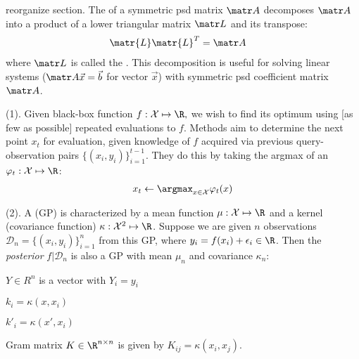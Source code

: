 \documentclass[11pt]{article}
\begin{document}
  reorganize section. The  of a symmetric psd matrix $\matr A$ decomposes $\matr A$ into a product of a lower triangular matrix $\matr L$ and its transpose:
\begin{align}
	\matr{L} \matr{L}^T &= \matr A
\end{align}
where $\matr L$ is called the . This decomposition is useful for solving linear systems ($\matr A \vec x = \vec b$ for vector $\vec x$) with symmetric psd coefficient matrix $\matr A$. 






 (1). Given black-box function $f : \mathcal{X} \mapsto \R,$ we wish to find its optimum using [as few as possible] repeated evaluations to $f$. Methods aim to determine the next point $x_t$ for evaluation, given knowledge of $f$ acquired via previous query-observation pairs $\{(x_i, y_i)\}_{i=1}^{t-1}$. They do this by taking the argmax of an  $\varphi_t : \mathcal{X} \mapsto \R$:
\begin{align}
	x_t \leftarrow \argmax_{x \in \mathcal X} \varphi_t(x)
\end{align}


 (2). A  (GP) is characterized by a mean function $\mu : \mathcal X \mapsto \R$ and a kernel (covariance function) $\kappa : \mathcal{X}^2 \mapsto \R$. Suppose we are given $n$ observations $\mathcal{D}_n = \{(x_i, y_i)\}_{i=1}^n$ from this GP, where $y_i = f(x_i) + \epsilon_i \in \R$. Then the \textit{posterior} $f{|}\mathcal{D}_n$ is also a GP with mean $\mu_n$ and covariance $\kappa_n$:
\begin{compactitem}
	\item $Y \in R^n$ is a vector with $Y_i = y_i$
	\item $k_i = \kappa(x, x_i) $ 
	\item $k'_i = \kappa(x', x_i)$
	\item Gram matrix $K \in \R^{n \times n}$ is given by $K_{ij} = \kappa (x_i, x_j)$. 
\end{compactitem}
\vspace{1em}
\end{document}
